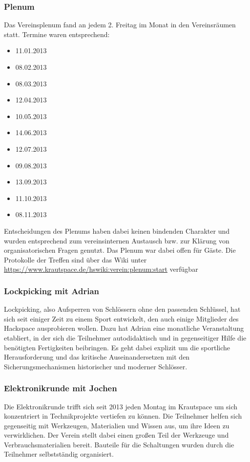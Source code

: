\documentclass[10pt,DIV16]{scrartcl}
\begin{document}
\subsubsection{Plenum}

Das Vereinsplenum fand an jedem 2. Freitag im Monat in den
Vereinsräumen statt. Termine waren entsprechend:

\begin{itemize}
	\item 11.01.2013
	\item 08.02.2013
	\item 08.03.2013
	\item 12.04.2013
	\item 10.05.2013
	\item 14.06.2013
	\item 12.07.2013
	\item 09.08.2013
	\item 13.09.2013
	\item 11.10.2013
	\item 08.11.2013
\end{itemize}

Entscheidungen des Plenums haben dabei keinen bindenden Charakter und 
wurden entsprechend zum vereinsinternen Austausch bzw. zur Klärung von 
organisatorischen Fragen genutzt. Das Plenum war dabei offen für Gäste. 
Die Protokolle der Treffen sind über das Wiki unter 
\url{https://www.krautspace.de/hswiki:verein:plenum:start} verfügbar


\subsubsection{Lockpicking mit Adrian}

Lockpicking, also Aufsperren von Schlössern ohne den passenden 
Schlüssel, hat sich seit einiger Zeit zu einem Sport entwickelt, den 
auch einige Mitglieder des Hackspace ausprobieren wollen. Dazu hat 
Adrian eine monatliche Veranstaltung etabliert, in der sich die Teilnehmer 
autodidaktisch und in gegenseitiger Hilfe die benötigten Fertigkeiten 
beibringen. Es geht dabei explizit um die sportliche Herausforderung 
und das kritische Auseinandersetzen mit den Sicherungsmechanismen 
historischer und moderner Schlösser. 

\subsubsection{Elektronikrunde mit Jochen}

Die Elektronikrunde trifft sich seit 2013 jeden Montag im Krautspace um 
sich konzentriert in Technikprojekte vertiefen zu können. Die 
Teilnehmer helfen sich gegenseitig mit Werkzeugen, Materialien und 
Wissen aus, um ihre Ideen zu verwirklichen. Der Verein stellt dabei 
einen großen Teil der Werkzeuge und Verbrauchsmaterialien bereit. 
Bauteile für die Schaltungen wurden durch die Teilnehmer selbstständig 
organisiert.
\end{document}
